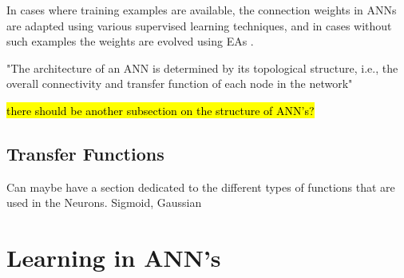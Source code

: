 In cases where training examples are available, the connection weights in ANNs are adapted using various supervised learning techniques, and in cases without such examples the weights are evolved using EAs \cite{dayhoff2001artificial,RefWorks:1}.


"The architecture of an ANN is determined by its topological structure, i.e., the overall connectivity and transfer function of each node in the network" \cite{XinYao1999}

\hl{there should be another subsection on the structure of ANN's?}

\subsection{Transfer Functions}
Can maybe have a section dedicated to the different types of functions that are used in the Neurons.
Sigmoid, Gaussian


\section{Learning in ANN's}



